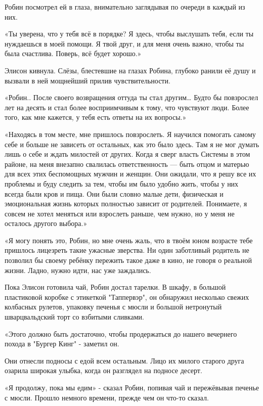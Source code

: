 \documentclass[a4paper,12pt]{book}
\begin{document}
\par
Робин посмотрел ей в глаза, внимательно заглядывая по очереди в каждый из них.
\par
«Ты уверена, что у тебя всё в порядке? Я здесь, чтобы выслушать тебя, если ты нуждаешься в моей помощи. Я твой друг, и для меня очень важно, чтобы ты была счастлива. Поверь, всё будет хорошо.»
\par
Элисон кивнула. Слёзы, блестевшие на глазах Робина, глубоко ранили её душу и вызвали в ней мощнейший прилив чувствительности.
\par
«Робин.. После своего возвращения оттуда ты стал другим… Будто бы повзрослел лет на десять и стал более восприимчивым к тому, что чувствуют люди. Более того, как мне кажется, у тебя есть ответы на их вопросы.»
\par
«Находясь в том месте, мне пришлось повзрослеть. Я научился помогать самому себе и больше не зависеть от остальных, как это было здесь. Там я не мог думать лишь о себе и ждать милостей от других. Когда я сверг власть Системы в этом районе, на меня внезапно свалилась ответственность — быть отцом и матерью для всех этих беспомощных мужчин и женщин. Они ожидали, что я решу все их проблемы и буду следить за тем, чтобы им было удобно жить, чтобы у них всегда были кров и пища. Они были словно малые дети, физическая и эмоциональная жизнь которых полностью зависит от родителей. Понимаете, я совсем не хотел меняться или взрослеть раньше, чем нужно, но у меня не осталось другого выбора.»
\par
«Я могу понять это, Робин, но мне очень жаль, что в твоём юном возрасте тебе пришлось лицезреть такие ужасные зверства. Ни один заботливый родитель не позволил бы своему ребёнку пережить такое даже в кино, не говоря о реальной жизни. Ладно, нужно идти, нас уже заждались.\\
\par
Пока Элисон готовила чай, Робин достал тарелки. В шкафу, в большой пластиковой коробке с этикеткой "Таппервэр", он обнаружил несколько свежих колбасных рулетов, упаковку печенья с мюсли и большой нетронутый шварцвальдский торт со взбитыми сливками.
\par
«Этого должно быть достаточно, чтобы продержаться до нашего вечернего похода в "Бургер Кинг" - заметил он.
\par
Они отнесли подносы с едой всем остальным. Лицо их милого старого друга озарила широкая улыбка, когда он разглядел на подносе десерт.
\par
«Я продолжу, пока мы едим» - сказал Робин, попивая чай и пережёвывая печенье с мюсли. Прошло немного времени, прежде чем он что-то сказал.
\end{document}
